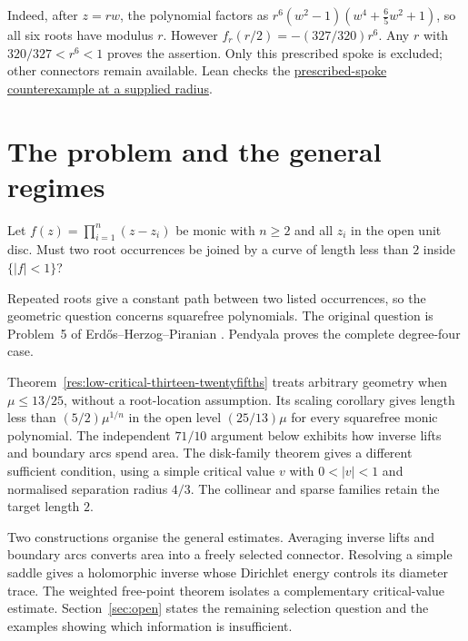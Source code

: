 \documentclass[11pt]{article}
\begin{document}
Indeed, after $z=rw$, the polynomial factors as
$r^6(w^2-1)(w^4+\tfrac65 w^2+1)$, so all six roots have modulus $r$.
However $f_r(r/2)=-(327/320)r^6$.  Any $r$ with $320/327<r^6<1$ proves the
assertion.  Only this prescribed spoke is excluded; other connectors remain
available.  Lean checks the \href{https://github.com/wcook04/plectis-erdos/blob/f36a98bf3d3e6f65f1074e3b800e3293d5b8a51a/ErdosProblems/Erdos1041/PaperTrinomial.lean#L79}{prescribed-spoke counterexample at a supplied radius}.

\section{The problem and the general regimes}\label{sec:problem}

\begin{problem}[Erd\H{o}s \#1041]\label{res:problem}
Let $f(z)=\prod_{i=1}^{n}(z-z_i)$ be monic with $n\ge2$ and all
$z_i$ in the open unit disc.  Must two root occurrences be joined by a curve
of length less than $2$ inside $\{|f|<1\}$?
\end{problem}

Repeated roots give a constant path between two listed occurrences, so the
geometric question concerns squarefree polynomials.  The original question
is Problem~5 of Erd\H{o}s--Herzog--Piranian \cite[p.~139]{ehp1958}.
Pendyala \cite[Thm.~1, p.~1]{june2026} proves the complete degree-four case.

Theorem~\ref{res:low-critical-thirteen-twentyfifths} treats arbitrary geometry
when $\mu\le13/25$, without a root-location assumption.  Its scaling
corollary gives length less than $(5/2)\mu^{1/n}$ in the open level
$(25/13)\mu$ for every squarefree monic polynomial.  The independent
$71/10$ argument below exhibits how inverse lifts and boundary arcs spend
area.
The disk-family theorem gives a different sufficient condition, using a
simple critical value $v$ with $0<|v|<1$ and normalised separation radius
$4/3$.  The collinear and sparse families retain the target length $2$.

Two constructions organise the general estimates.  Averaging inverse lifts
and boundary arcs converts area into a freely selected connector.  Resolving
a simple saddle gives a holomorphic inverse whose Dirichlet energy controls
its diameter trace.  The weighted free-point theorem isolates a complementary
critical-value estimate.  Section~\ref{sec:open} states the remaining
selection question and the examples showing which information is insufficient.
\end{document}
